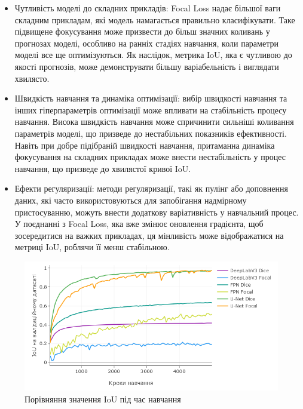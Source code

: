 \begin{itemize}

      \item Чутливість моделі до складних прикладів:
            Focal Loss надає більшої ваги складним прикладам,
            які модель намагається правильно класифікувати.
            Таке підвищене фокусування може призвести до більш
            значних коливань у прогнозах моделі, особливо на
            ранніх стадіях навчання, коли параметри моделі все
            ще оптимізуються. Як наслідок, метрика IoU, яка є
            чутливою до якості прогнозів, може демонструвати
            більшу варіабельність і виглядати хвилясто.
      \item Швидкість навчання та динаміка оптимізації:
            вибір швидкості навчання та інших гіперпараметрів
            оптимізації може впливати на стабільність процесу
            навчання. Висока швидкість навчання може спричинити
            сильніші коливання параметрів моделі, що призведе до
            нестабільних показників ефективності. Навіть при добре
            підібраній швидкості навчання, притаманна динаміка
            фокусування на складних прикладах
            може внести нестабільність у процес навчання, що
            призведе до хвилястої кривої IoU.
      \item Ефекти регуляризації: методи регуляризації,
            такі як пулінг або доповнення даних, які
            часто використовуються для запобігання надмірному
            пристосуванню, можуть внести додаткову варіативність
            у навчальний процес. У поєднанні з Focal Loss,
            яка вже змінює оновлення градієнта, щоб зосередитися
            на важких прикладах, ця мінливість може відображатися
            на метриці IoU, роблячи її менш стабільною.

\end{itemize}

\begin{figure}[ht]
      \centering
      \includegraphics[scale=0.8]{Images/iou_comp.png}
      \caption{Порівняння значення IoU під час навчання}
      \label{iou_comp}
\end{figure}

